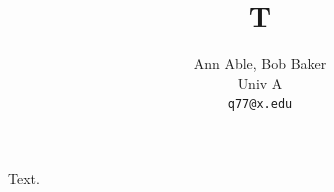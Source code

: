 \documentclass{article}
\title{T}
\author{Ann Able, Bob Baker \\ Univ A \\ \texttt{q77@x.edu}}
\begin{document}
\maketitle
Text.
\end{document}
